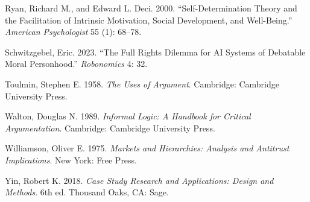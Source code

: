 \documentclass[
  11pt,
]{article}
\newlength{\cslhangindent}
\newenvironment{CSLReferences}[2] %
 {\begin{list}{}{%
  \setlength{\itemindent}{0pt}
  \setlength{\leftmargin}{0pt}
  \setlength{\parsep}{0pt}
  \ifodd #1
   \setlength{\leftmargin}{\cslhangindent}
   \setlength{\itemindent}{-1\cslhangindent}
  \fi
  \setlength{\itemsep}{#2\baselineskip}}}
 {\end{list}}
\begin{document}
\begin{CSLReferences}{1}{0}
Ryan, Richard M., and Edward L. Deci. 2000. {``Self-Determination Theory
and the Facilitation of Intrinsic Motivation, Social Development, and
Well-Being.''} \emph{American Psychologist} 55 (1): 68--78.

Schwitzgebel, Eric. 2023. {``The Full Rights Dilemma for {AI} Systems of
Debatable Moral Personhood.''} \emph{Robonomics} 4: 32.

Toulmin, Stephen E. 1958. \emph{The Uses of Argument}. Cambridge:
Cambridge University Press.

Walton, Douglas N. 1989. \emph{Informal Logic: A Handbook for Critical
Argumentation}. Cambridge: Cambridge University Press.

Williamson, Oliver E. 1975. \emph{Markets and Hierarchies: Analysis and
Antitrust Implications}. New York: Free Press.

Yin, Robert K. 2018. \emph{Case Study Research and Applications: Design
and Methods}. 6th ed. Thousand Oaks, CA: Sage.

\end{CSLReferences}
\end{document}
